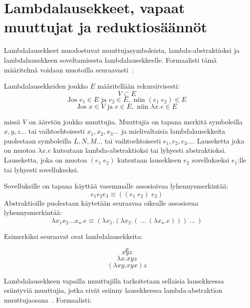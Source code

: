 \section{Lambdalausekkeet, vapaat muuttujat ja reduktiosäännöt}

Lambdalausekkeet muodostuvat muuttujasymboleista, lambda-abstraktioksi ja lambdalausekkeen soveltamisesta lambdalausekkeelle. Formaalisti tämä määritelmä voidaan muotoilla seuraavasti~\cite[s.~8]{Hudak89}:

\begin{maar}[lambdalausekkeet]
Lambdalausekkeiden joukko $E$ määritellään rekursiivisesti: 
\[ V \subset E \]
\[ \text{Jos } e_{1} \in E \text{ ja } e_{2} \in E, \text{ niin }  (e_{1} \; e_{2}) \in E \]
\[ \text{Jos } x \in V \text{ ja } e \in E, \text{ niin } \lambda x.e \in E \]

missä $V$ on ääretön joukko muuttujia. Muuttujia on tapana merkitä symboleilla $x, y,z...$ tai vaihtoehtoisesti $x_{1}, x_{2}, x_{3}...$ ja mielivaltaisia lambdalausekkeita puolestaan symboleilla $L, N, M ...$ tai vaihtoehtoisesti $e_{1}, e_{2}, e_{3}...$.  Lauseketta joka on muotoa $\lambda x.e$ kutsutaan lambda-abstraktioksi tai lyhyesti abstraktioksi. Lauseketta, joka on muotoa $(e_{1} \; e_{2})$ kutsutaan lausekkeen $e_{2}$ sovellukseksi $e_{1}$:lle tai lyhyesti sovellukseksi.
\end{maar}

Sovelluksille on tapana käyttää vasemmalle assosioivaa lyhennysmerkintää: 
\[e_{1} e_{2} e_{3} \equiv ((e_{1} \; e_{2}) \; e_{3})\]
Abstraktioille puolestaan käytetään seuraavaa oikealle assosiovaa lyhennysmerkintää: 
\[ \lambda x_{1}x_{2}...x_{n}.e \equiv (\lambda x_{1} . ( \lambda x_{2} . ( \: ... \: ( \lambda x_{n} . e ))) \: ... \: ) \]

\par
Esimerkiksi seuraavat ovat lambdalausekkeita:

\[ x \]
\[ xyz \]
\[ \lambda x . xyz \]
\[ (\lambda xy . xyx) z \]


Lambdalausekkeen vapailla muuttujilla tarkoitetaan sellaisia lausekkeessa esiintyviä muuttujia, jotka eivät esiinny lausekkeessa lambda-abstraktion muuttujaosana~\cite[s.~8]{Hudak89}. Formaalisti: 

